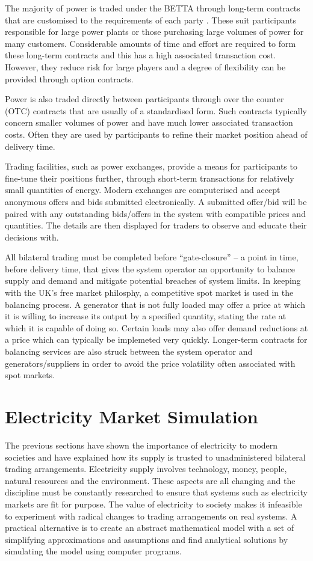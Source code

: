 The majority of power is traded under the BETTA through long-term contracts
that are customised to the requirements of each party \cite{kirschen:book}.
These suit participants responsible for large power plants or those purchasing
large volumes of power for many customers.  Considerable amounts of time and
effort are required to form these long-term contracts and this has a high
associated transaction cost.  However, they reduce risk for large players and
a degree of flexibility can be provided through option contracts.

Power is also traded directly between participants through over the counter
(OTC) contracts that are usually of a standardised form.  Such contracts
typically concern smaller volumes of power and have much lower associated
transaction costs.  Often they are used by participants to refine their market
position ahead of delivery time.

Trading facilities, such as power exchanges, provide a means for participants
to fine-tune their positions further, through short-term transactions for
relatively small quantities of energy.  Modern exchanges are computerised and
accept anonymous offers and bids submitted electronically.  A submitted
offer/bid will be paired with any outstanding bids/offers in the system with
compatible prices and quantities.  The details are then displayed for traders
to observe and educate their decisions with.

All bilateral trading must be completed before ``gate-closure'' -- a point
in time, before delivery time, that gives the system operator an
opportunity to balance supply and demand and mitigate potential breaches of
system limits.  In keeping with the UK's free market philosphy, a competitive
spot market \cite{schweppe:spot} is used in the balancing process.  A
generator that is not fully loaded may offer a price at which it is willing to
increase its output by a specified quantity, stating the rate at which it is
capable of doing so.  Certain loads may also offer demand reductions at a
price which can typically be implemeted very quickly.  Longer-term contracts
for balancing services are also struck between the system operator and
generators/suppliers in order to avoid the price volatility often associated
with spot markets.

\section{Electricity Market Simulation}
The previous sections have shown the importance of electricity to modern
societies and have explained how its supply is trusted to unadministered
bilateral trading arrangements.  Electricity supply involves technology, money,
people, natural resources and the environment.  These aspects are all changing
and the discipline must be constantly researched to ensure that systems such as
electricity markets are fit for purpose.  The value of electricity to society
makes it infeasible to experiment with radical changes to trading arrangements
on real systems.  A practical alternative is to create an abstract mathematical
model with a set of simplifying approximations and assumptions and find
analytical solutions by simulating the model using computer programs.

